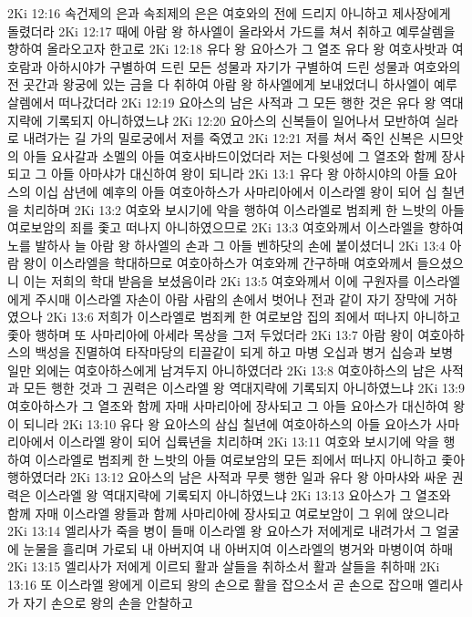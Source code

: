 2Ki 12:16  속건제의 은과 속죄제의 은은 여호와의 전에 드리지 아니하고 제사장에게 돌렸더라
2Ki 12:17  때에 아람 왕 하사엘이 올라와서 가드를 쳐서 취하고 예루살렘을 향하여 올라오고자 한고로
2Ki 12:18  유다 왕 요아스가 그 열조 유다 왕 여호사밧과 여호람과 아하시야가 구별하여 드린 모든 성물과 자기가 구별하여 드린 성물과 여호와의 전 곳간과 왕궁에 있는 금을 다 취하여 아람 왕 하사엘에게 보내었더니 하사엘이 예루살렘에서 떠나갔더라
2Ki 12:19  요아스의 남은 사적과 그 모든 행한 것은 유다 왕 역대지략에 기록되지 아니하였느냐
2Ki 12:20  요아스의 신복들이 일어나서 모반하여 실라로 내려가는 길 가의 밀로궁에서 저를 죽였고
2Ki 12:21  저를 쳐서 죽인 신복은 시므앗의 아들 요사갈과 소멜의 아들 여호사바드이었더라 저는 다윗성에 그 열조와 함께 장사되고 그 아들 아마샤가 대신하여 왕이 되니라
2Ki 13:1  유다 왕 아하시야의 아들 요아스의 이십 삼년에 예후의 아들 여호아하스가 사마리아에서 이스라엘 왕이 되어 십 칠년을 치리하며
2Ki 13:2  여호와 보시기에 악을 행하여 이스라엘로 범죄케 한 느밧의 아들 여로보암의 죄를 좇고 떠나지 아니하였으므로
2Ki 13:3  여호와께서 이스라엘을 향하여 노를 발하사 늘 아람 왕 하사엘의 손과 그 아들 벤하닷의 손에 붙이셨더니
2Ki 13:4  아람 왕이 이스라엘을 학대하므로 여호아하스가 여호와께 간구하매 여호와께서 들으셨으니 이는 저희의 학대 받음을 보셨음이라
2Ki 13:5  여호와께서 이에 구원자를 이스라엘에게 주시매 이스라엘 자손이 아람 사람의 손에서 벗어나 전과 같이 자기 장막에 거하였으나
2Ki 13:6  저희가 이스라엘로 범죄케 한 여로보암 집의 죄에서 떠나지 아니하고 좇아 행하며 또 사마리아에 아세라 목상을 그저 두었더라
2Ki 13:7  아람 왕이 여호아하스의 백성을 진멸하여 타작마당의 티끌같이 되게 하고 마병 오십과 병거 십승과 보병 일만 외에는 여호아하스에게 남겨두지 아니하였더라
2Ki 13:8  여호아하스의 남은 사적과 모든 행한 것과 그 권력은 이스라엘 왕 역대지략에 기록되지 아니하였느냐
2Ki 13:9  여호아하스가 그 열조와 함께 자매 사마리아에 장사되고 그 아들 요아스가 대신하여 왕이 되니라
2Ki 13:10  유다 왕 요아스의 삼십 칠년에 여호아하스의 아들 요아스가 사마리아에서 이스라엘 왕이 되어 십륙년을 치리하며
2Ki 13:11  여호와 보시기에 악을 행하여 이스라엘로 범죄케 한 느밧의 아들 여로보암의 모든 죄에서 떠나지 아니하고 좇아 행하였더라
2Ki 13:12  요아스의 남은 사적과 무릇 행한 일과 유다 왕 아마샤와 싸운 권력은 이스라엘 왕 역대지략에 기록되지 아니하였느냐
2Ki 13:13  요아스가 그 열조와 함께 자매 이스라엘 왕들과 함께 사마리아에 장사되고 여로보암이 그 위에 앉으니라
2Ki 13:14  엘리사가 죽을 병이 들매 이스라엘 왕 요아스가 저에게로 내려가서 그 얼굴에 눈물을 흘리며 가로되 내 아버지여 내 아버지여 이스라엘의 병거와 마병이여 하매
2Ki 13:15  엘리사가 저에게 이르되 활과 살들을 취하소서 활과 살들을 취하매
2Ki 13:16  또 이스라엘 왕에게 이르되 왕의 손으로 활을 잡으소서 곧 손으로 잡으매 엘리사가 자기 손으로 왕의 손을 안찰하고
